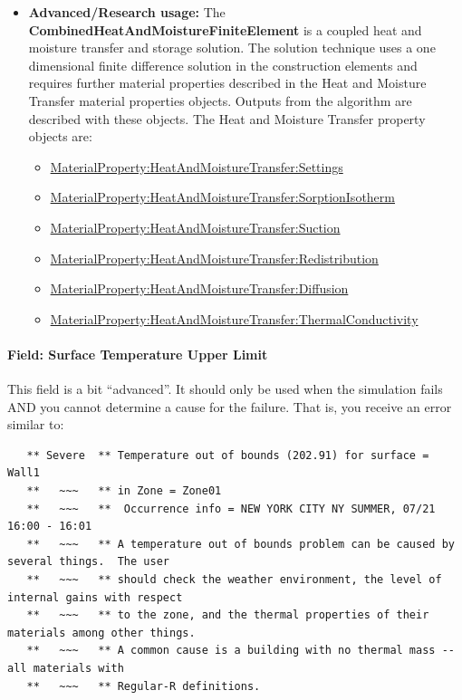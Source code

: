 \begin{itemize}
\item
  \textbf{Advanced/Research usage:} The \textbf{CombinedHeatAndMoistureFiniteElement} is a coupled heat and moisture transfer and storage solution. The solution technique uses a one dimensional finite difference solution in the construction elements and requires further material properties described in the Heat and Moisture Transfer material properties objects. Outputs from the algorithm are described with these objects. The Heat and Moisture Transfer property objects are:
  \begin{itemize}
  \item
    \hyperref[materialpropertyheatandmoisturetransfersettings]{MaterialProperty:HeatAndMoistureTransfer:Settings}
  \item
    \hyperref[materialpropertyheatandmoisturetransfersorptionisotherm]{MaterialProperty:HeatAndMoistureTransfer:SorptionIsotherm}
  \item
    \hyperref[materialpropertyheatandmoisturetransfersuction]{MaterialProperty:HeatAndMoistureTransfer:Suction}
  \item
    \hyperref[materialpropertyheatandmoisturetransferredistribution]{MaterialProperty:HeatAndMoistureTransfer:Redistribution}
  \item
    \hyperref[materialpropertyheatandmoisturetransferdiffusion]{MaterialProperty:HeatAndMoistureTransfer:Diffusion}
  \item
    \hyperref[materialpropertyheatandmoisturetransferthermalconductivity]{MaterialProperty:HeatAndMoistureTransfer:ThermalConductivity}
  \end{itemize}
\end{itemize}

\paragraph{Field: Surface Temperature Upper Limit}\label{field-surface-temperature-upper-limit}

This field is a bit ``advanced''. It should only be used when the simulation fails AND you cannot determine a cause for the failure. That is, you receive an error similar to:

\begin{lstlisting}
   ** Severe  ** Temperature out of bounds (202.91) for surface = Wall1
   **   ~~~   ** in Zone = Zone01
   **   ~~~   **  Occurrence info = NEW YORK CITY NY SUMMER, 07/21 16:00 - 16:01
   **   ~~~   ** A temperature out of bounds problem can be caused by several things.  The user
   **   ~~~   ** should check the weather environment, the level of internal gains with respect
   **   ~~~   ** to the zone, and the thermal properties of their materials among other things.
   **   ~~~   ** A common cause is a building with no thermal mass -- all materials with
   **   ~~~   ** Regular-R definitions.
\end{lstlisting}

